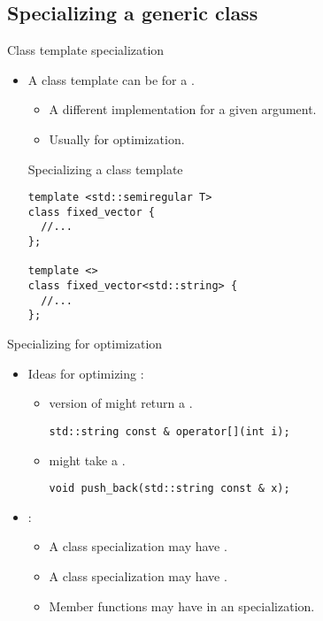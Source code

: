 \subsection{Specializing a generic class}

\begin{frame}[t,fragile]{Class template specialization}
\begin{itemize}
  \item A class template can be  for a .
    \begin{itemize}
      \item A different implementation for a given argument.
      \item Usually for optimization.
    \end{itemize}

\begin{block}{Specializing a class template}
\begin{lstlisting}
template <std::semiregular T>
class fixed_vector {
  //...
};

template <>
class fixed_vector<std::string> {
  //...
};
\end{lstlisting}
\end{block}

\end{itemize}
\end{frame}


\begin{frame}[t,fragile]{Specializing for optimization}
\begin{itemize}
  \item Ideas for optimizing :
    \begin{itemize}
      \item {} version of  might return a .
\begin{lstlisting}
std::string const & operator[](int i);
\end{lstlisting}
      \item {} might take a .
\begin{lstlisting}
void push_back(std::string const & x);
\end{lstlisting}
    \end{itemize}

  \item {}:
    \begin{itemize}
      \item A class specialization may have .
      \item A class specialization may have .
      \item Member functions may have  
            in an specialization.
    \end{itemize}
\end{itemize}
\end{frame}

